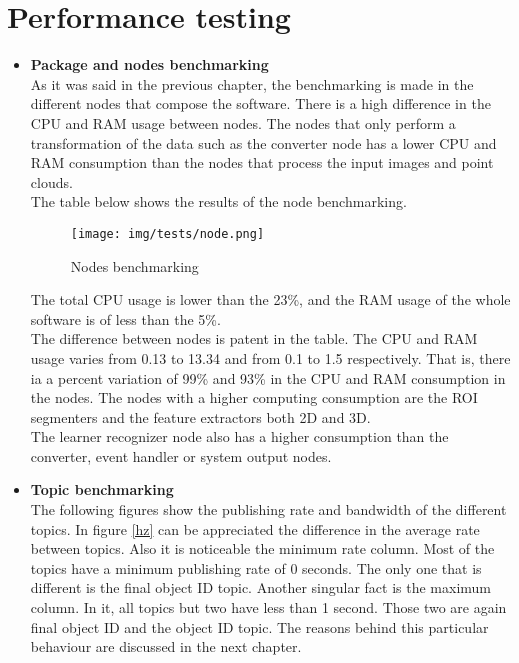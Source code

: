 \section{Performance testing}

	\begin{itemize}
		\item{\textbf{Package and nodes benchmarking}}
		\\

			As it was said in the previous chapter, the benchmarking is made in the different nodes that compose the software. 
			There is a high difference in the CPU and RAM usage between nodes.
			The nodes that only perform a transformation of the data such as the converter node has a lower CPU and RAM consumption than the nodes that process the input images and point clouds. 
			\\

			The table below shows the results of the node benchmarking. 

			\begin{figure}[h]
				\begin{center}
			    \texttt{[image: img/tests/node.png]}
				\caption[Nodes benchmarking]{Nodes benchmarking}
				\end{center}
			\end{figure}

			The total CPU usage is lower than the 23\%, and the RAM usage of the whole software is of less than the 5\%. 
			\\


			The difference between nodes is patent in the table.
			The CPU and RAM usage varies from  0.13 to 13.34 and from 0.1 to 1.5 respectively. 
			That is, there ia a percent variation of 99\% and  93\%  in the CPU and RAM consumption in the nodes. 
			The nodes with a higher computing consumption are the ROI segmenters and the feature extractors both 2D and 3D.
			\\

			The learner recognizer node also has a higher consumption than the converter, event handler or system output nodes. 
			
			\newpage

		\item{\textbf{Topic benchmarking}}\\

			The following figures show the publishing rate and bandwidth of the different topics. 
			In figure \ref{hz} can be appreciated the difference in the average rate between topics. 
			Also it is noticeable the minimum rate column. 
			Most of the topics have a minimum publishing rate of 0 seconds.
			The only one that is different is the final object ID topic. 
			Another singular fact is the maximum column. 
			In it, all topics but two have less than 1 second. 
			Those two are again final object ID and the object ID topic. 
			The reasons behind this particular behaviour are discussed in the next chapter. 


\end{itemize}
